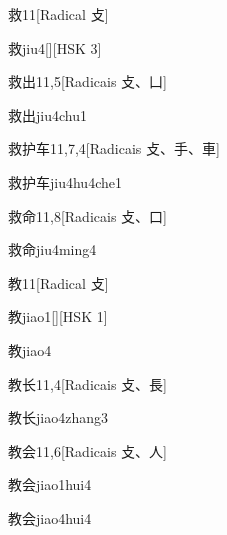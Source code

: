 \begin{entry}{救}{11}[Radical ⽁]
  \begin{phonetics}{救}{jiu4}[][HSK 3]
  \end{phonetics}
\end{entry}

\begin{entry}{救出}{11,5}[Radicais ⽁、⼐]
  \begin{phonetics}{救出}{jiu4chu1}
  \end{phonetics}
\end{entry}

\begin{entry}{救护车}{11,7,4}[Radicais ⽁、⼿、⾞]
  \begin{phonetics}{救护车}{jiu4hu4che1}
  \end{phonetics}
\end{entry}

\begin{entry}{救命}{11,8}[Radicais ⽁、⼝]
  \begin{phonetics}{救命}{jiu4ming4}
  \end{phonetics}
\end{entry}

\begin{entry}{教}{11}[Radical ⽁]
  \begin{phonetics}{教}{jiao1}[][HSK 1]
  \end{phonetics}
  \begin{phonetics}{教}{jiao4}
  \end{phonetics}
\end{entry}

\begin{entry}{教长}{11,4}[Radicais ⽁、⾧]
  \begin{phonetics}{教长}{jiao4zhang3}
  \end{phonetics}
\end{entry}

\begin{entry}{教会}{11,6}[Radicais ⽁、⼈]
  \begin{phonetics}{教会}{jiao1hui4}
  \end{phonetics}
  \begin{phonetics}{教会}{jiao4hui4}
  \end{phonetics}
\end{entry}

